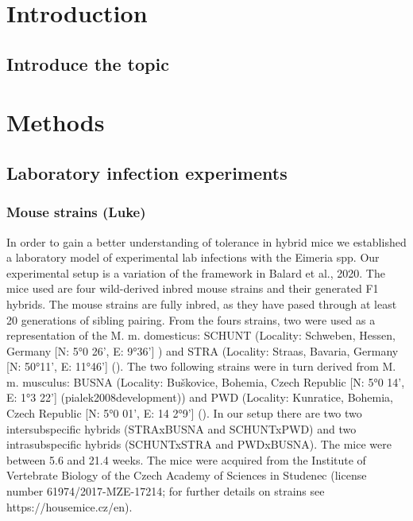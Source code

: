\documentclass[webpdf,large,contemporary,namedate]{oup-authoring-template}
\theoremstyle{thmstyleone}
\theoremstyle{thmstyletwo}
\theoremstyle{thmstylethree}
\begin{document}


\maketitle


\hypertarget{introduction}{%
\section{Introduction}\label{introduction}}

\hypertarget{introduce-the-topic}{%
\subsection{Introduce the topic}\label{introduce-the-topic}}

\hypertarget{methods}{%
\section{Methods}\label{methods}}

\hypertarget{laboratory-infection-experiments}{%
\subsection{Laboratory infection
experiments}\label{laboratory-infection-experiments}}

\hypertarget{mouse-strains-luke}{%
\subsubsection{Mouse strains (Luke)}\label{mouse-strains-luke}}

In order to gain a better understanding of tolerance in hybrid mice we
established a laboratory model of experimental lab infections with the
Eimeria spp. Our experimental setup is a variation of the framework in
Balard et al., 2020. The mice used are four wild-derived inbred mouse
strains and their generated F1 hybrids. The mouse strains are fully
inbred, as they have pased through at least 20 generations of sibling
pairing. From the fours strains, two were used as a representation of
the M. m. domesticus: SCHUNT (Locality: Schweben, Hessen, Germany {[}N:
5°0 26', E: 9°36'{]} \citet{martincova2019phenotypic}) and STRA
(Locality: Straas, Bavaria, Germany {[}N: 50°11', E: 11°46'{]}
(\citet{pialek2008development}). The two following strains were in turn
derived from M. m. musculus: BUSNA (Locality: Buškovice, Bohemia, Czech
Republic {[}N: 5°0 14', E: 1°3 22'{]} (pialek2008development)) and PWD
(Locality: Kunratice, Bohemia, Czech Republic {[}N: 5°0 01', E: 14
2°9'{]} (\citet{gregorova2000pwd}). In our setup there are two two
intersubspecific hybrids (STRAxBUSNA and SCHUNTxPWD) and two
intrasubspecific hybrids (SCHUNTxSTRA and PWDxBUSNA). The mice were
between 5.6 and 21.4 weeks. The mice were acquired from the Institute of
Vertebrate Biology of the Czech Academy of Sciences in Studenec (license
number 61974/2017-MZE-17214; for further details on strains see
https://housemice.cz/en).
\end{document}
